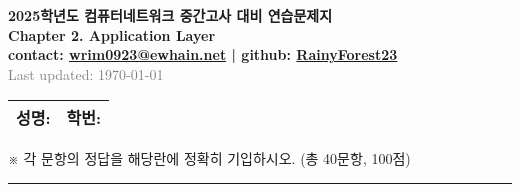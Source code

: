 \documentclass[a4paper, 10pt]{article}
\begin{document}
\begin{center}
  \Large\textbf{2025학년도 컴퓨터네트워크 중간고사 대비 연습문제지}\\[8pt]
  \large\textbf{Chapter 2. Application Layer}\\[5pt]
  \small\textbf{contact: \href{mailto:wrim0923@ewhain.net}{wrim0923@ewhain.net} | github: \href{https://github.com/RainyForest23}{RainyForest23}}\\[5pt]
  \small\textcolor{gray}{Last updated: \today}
\end{center}

\vspace{0.5cm}

\begin{tabular}{|m{}|m{}|}
\hline
\textbf{성명:} \hfill & \textbf{학번:} \hfill \\[0.8em]
\hline
\end{tabular}
\vspace{1em}

\noindent
{\small ※ 각 문항의 정답을 해당란에 정확히 기입하시오. (총 40문항, 100점)}

\vspace{0.5em}
\noindent\rule{\textwidth}{0.8pt}
\vspace{0.5em}
\end{document}
